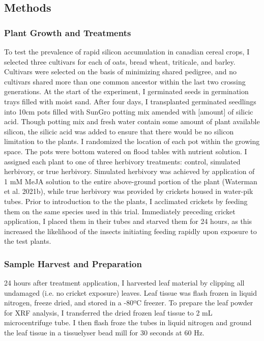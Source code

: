 \documentclass[12pt, letterpaper, ]{article}
\begin{document}
\subsection{Methods}

\subsubsection{Plant Growth and Treatments}

To test the prevalence of rapid silicon accumulation in canadian cereal crops, I selected three cultivars for each of oats, bread wheat, triticale, and barley. Cultivars were selected on the basis of minimizing shared pedigree, and no cultivars shared more than one common ancestor within the last two crossing generations. At the start of the experiment, I germinated seeds in germination trays filled with moist sand. After four days, I transplanted germinated seedlings into 10cm pots filled with SunGro potting mix amended with [amount] of silicic acid. Though potting mix and fresh water contain some amount of plant available silicon, the silicic acid was added to ensure that there would be no silicon limitation to the plants. I randomized the location of each pot within the growing space. The pots were bottom watered on flood tables with nutrient solution. I assigned each plant to one of three herbivory treatments: control, simulated herbivory, or true herbivory. Simulated herbivory was achieved by application of 1 mM MeJA solution to the entire above-ground portion of the plant (Waterman et al. 2021b), while true herbivory was provided by crickets housed in water-pik tubes. Prior to introduction to the the plants, I acclimated crickets by feeding them on the same species used in this trial. Immediately preceding cricket application, I placed them in their tubes and starved them for 24 hours, as this increased the likelihood of the insects initiating feeding rapidly upon exposure to the test plants. 

\subsubsection{Sample Harvest and Preparation}

24 hours after treatment application, I harvested leaf material by clipping all undamaged (i.e. no cricket exposure) leaves. Leaf tissue was flash frozen in liquid nitrogen, freeze dried, and stored in a -80ºC freezer. To prepare the leaf powder for XRF analysis, I transferred the dried frozen leaf tissue to 2 mL microcentrifuge tube. I then flash froze the tubes in liquid nitrogen and ground the leaf tissue in a tissuelyser bead mill for 30 seconds at 60 Hz.
\end{document}
